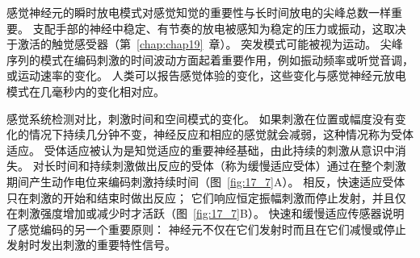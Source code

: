 感觉神经元的瞬时放电模式对感觉知觉的重要性与长时间放电的尖峰总数一样重要。 
支配手部的神经中稳定、有节奏的放电被感知为稳定的压力或振动，这取决于激活的触觉感受器（第~\ref{chap:chap19}~章）。 
突发模式可能被视为运动。 
尖峰序列的模式在编码刺激的时间波动方面起着重要作用，例如振动频率或听觉音调，或运动速率的变化。 
人类可以报告感觉体验的变化，这些变化与感觉神经元放电模式在几毫秒内的变化相对应。


感觉系统检测对比，刺激时间和空间模式的变化。 
如果刺激在位置或幅度没有变化的情况下持续几分钟不变，神经反应和相应的感觉就会减弱，这种情况称为受体适应。 
受体适应被认为是知觉适应的重要神经基础，由此持续的刺激从意识中消失。
对长时间和持续刺激做出反应的受体（称为缓慢适应受体）通过在整个刺激期间产生动作电位来编码刺激持续时间（图~\ref{fig:17_7}A）。 
相反，快速适应受体只在刺激的开始和结束时做出反应； 
它们响应恒定振幅刺激而停止发射，并且仅在刺激强度增加或减少时才活跃（图~\ref{fig:17_7}B）。
快速和缓慢适应传感器说明了感觉编码的另一个重要原则：
神经元不仅在它们发射时而且在它们减慢或停止发射时发出刺激的重要特性信号。


